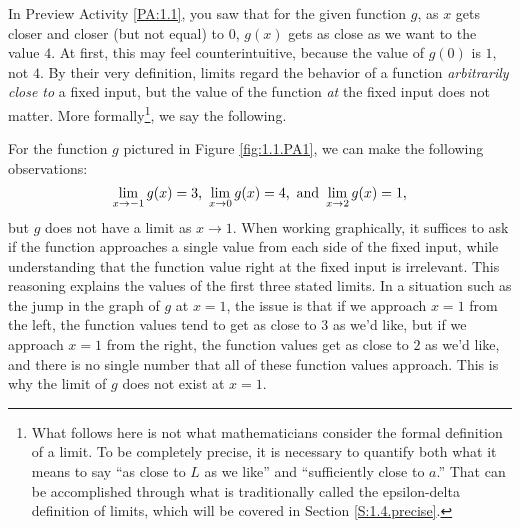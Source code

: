 In Preview Activity \ref{PA:1.1}, you saw that for the given function $g$, as $x$ gets closer and closer (but not equal) to $0$, $g(x)$ gets as close as we want to the value $4$.  At first, this may feel counterintuitive, because the value of $g(0)$ is $1$, not $4$.  By their very definition, limits regard the behavior of a function \emph{arbitrarily close to} a fixed input, but the value of the function \emph{at} the fixed input does not matter.  More formally\footnote{What follows here is not what mathematicians consider the formal definition of a limit.  To be completely precise, it is necessary to quantify both what it means to say ``as close to $L$ as we like'' and ``sufficiently close to $a$.''  That can be accomplished through what is traditionally called the epsilon-delta definition of limits, which will be covered in Section \ref{S:1.4.precise}.}, we say the following.


For the function $g$ pictured in Figure \ref{fig:1.1.PA1}, we can make the following observations:  
\[ \displaystyle \lim_{x \to -1} g(x) = 3, \ \displaystyle \lim_{x \to 0} g(x) = 4, \ \mbox{and} \ \displaystyle \lim_{x \to 2} g(x) = 1, \] 
but $g$ does not have a limit as $x \to 1$.  When working graphically, it suffices to ask if the function approaches a single value from each side of the fixed input, while understanding that the function value right at the fixed input is irrelevant.  This reasoning explains the values of the first three stated limits.  In a situation such as the jump in the graph of $g$ at $x = 1$, the issue is that if we approach $x = 1$ from the left, the function values tend to get as close to $3$ as we'd like, but if we approach $x = 1$ from the right, the function values get as close to $2$ as we'd like, and there is no single number that all of these function values approach.  This is why the limit of $g$ does not exist at $x = 1$.

